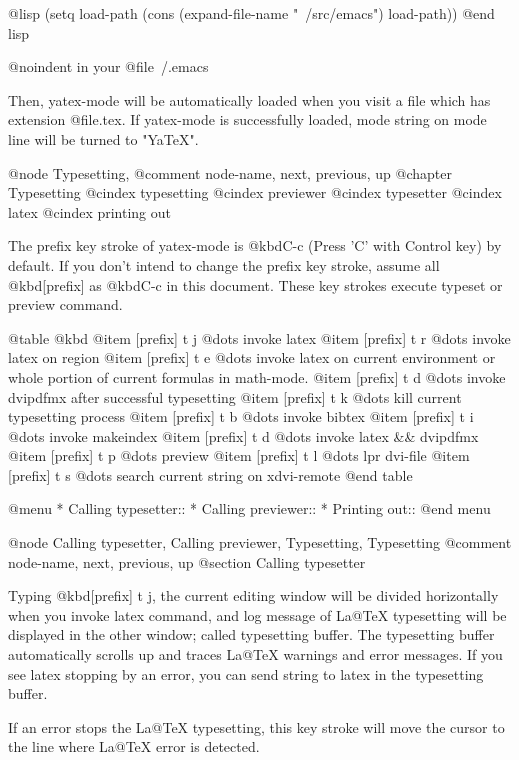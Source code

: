 @lisp
       (setq load-path
             (cons (expand-file-name "~/src/emacs") load-path))
@end lisp

@noindent
in your @file{~/.emacs}

  Then, yatex-mode will be automatically loaded when you visit a
file which has extension @file{.tex}.  If yatex-mode is successfully
loaded, mode string on mode line will be turned to "YaTeX".


@node Typesetting, %
@comment  node-name,  next,  previous,  up
@chapter Typesetting
@cindex typesetting
@cindex previewer
@cindex typesetter
@cindex latex
@cindex printing out

  The prefix key stroke of yatex-mode is @kbd{C-c} (Press 'C' with Control
key) by default.  If you don't intend to change the prefix key stroke,
assume all @kbd{[prefix]} as @kbd{C-c} in this document.  These key
strokes execute typeset or preview command.

@table @kbd
@item [prefix] t j
        @dots{} invoke latex
@item [prefix] t r
        @dots{} invoke latex on region
@item [prefix] t e
        @dots{} invoke latex on current environment or whole
         portion of current formulas in math-mode.
@item [prefix] t d
	@dots{} invoke dvipdfmx after successful typesetting
@item [prefix] t k
        @dots{} kill current typesetting process
@item [prefix] t b
        @dots{} invoke bibtex
@item [prefix] t i
        @dots{} invoke makeindex
@item [prefix] t d
        @dots{} invoke latex && dvipdfmx
@item [prefix] t p
        @dots{} preview
@item [prefix] t l
        @dots{} lpr dvi-file
@item [prefix] t s
        @dots{} search current string on xdvi-remote
@end table

@menu
* Calling typesetter::          
* Calling previewer::           
* Printing out::                
@end menu

@node Calling typesetter, Calling previewer, Typesetting, Typesetting
@comment  node-name,  next,  previous,  up
@section Calling typesetter

  Typing @kbd{[prefix] t j}, the current editing window will be divided
horizontally when you invoke latex command, and log message of La@TeX{}
typesetting will be displayed in the other window; called typesetting
buffer.  The typesetting buffer automatically scrolls up and traces
La@TeX{} warnings and error messages.  If you see latex stopping by an
error, you can send string to latex in the typesetting buffer.

  If an error  stops the La@TeX{}  typesetting, this  key stroke will
move the cursor to the line where La@TeX{} error is detected.

